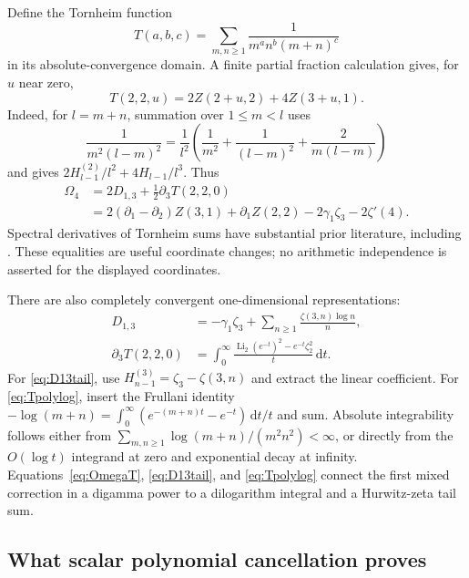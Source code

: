 \documentclass[11pt,a4paper]{article}
\numberwithin{equation}{section}
\theoremstyle{definition}
\theoremstyle{remark}
\DeclareMathOperator{\Li}{Li}
\newcommand{\dd}{\mathrm d}
\begin{document}
Define the Tornheim function
\[
 T(a,b,c)=\sum_{m,n\ge1}\frac1{m^an^b(m+n)^c}
\]
in its absolute-convergence domain.  A finite partial fraction
calculation gives, for $u$ near zero,
\begin{equation}
 T(2,2,u)=2Z(2+u,2)+4Z(3+u,1).
 \label{eq:T22}
\end{equation}
Indeed, for $l=m+n$, summation over $1\le m<l$ uses
\[
 \frac1{m^2(l-m)^2}
 =\frac1{l^2}\left(\frac1{m^2}+\frac1{(l-m)^2}
                    +\frac2{m(l-m)}\right)
\]
and gives $2H_{l-1}^{(2)}/l^2+4H_{l-1}/l^3$.
Thus
\begin{align}
 \Omega_4
 &=2D_{1,3}+\tfrac12\partial_3T(2,2,0)
 \label{eq:OmegaT}\\
 &=2(\partial_1-\partial_2)Z(3,1)+\partial_1Z(2,2)
                      -2\gamma_1\zeta_3-2\zeta'(4).
 \label{eq:OmegaInner}
\end{align}
Spectral derivatives of Tornheim sums have substantial prior literature,
including \cite{BB2014}.  These equalities are useful coordinate changes;
no arithmetic independence is asserted for the displayed coordinates.

There are also completely convergent one-dimensional representations:
\begin{align}
 D_{1,3}
  &=-\gamma_1\zeta_3+
        \sum_{n\ge1}\frac{\zeta(3,n)\log n}{n},
 \label{eq:D13tail}\\
 \partial_3T(2,2,0)
  &=\int_0^\infty
        \frac{\Li_2(e^{-t})^2-e^{-t}\zeta_2^2}{t}\,\dd t.
 \label{eq:Tpolylog}
\end{align}
For \eqref{eq:D13tail}, use
$H_{n-1}^{(3)}=\zeta_3-\zeta(3,n)$ and extract the linear
coefficient.  For \eqref{eq:Tpolylog}, insert the Frullani identity
$-\log(m+n)=\int_0^\infty(e^{-(m+n)t}-e^{-t})\,\dd t/t$
and sum.  Absolute integrability follows either from
$\sum_{m,n\ge1}\log(m+n)/(m^2n^2)<\infty$, or directly from
the $O(\log t)$ integrand at zero and exponential decay at infinity.
Equations~\eqref{eq:OmegaT}, \eqref{eq:D13tail}, and
\eqref{eq:Tpolylog} connect the first mixed correction in a digamma
power to a dilogarithm integral and a Hurwitz-zeta tail sum.

\subsection{What scalar polynomial cancellation proves}
\label{subsec:canonical}
\end{document}
